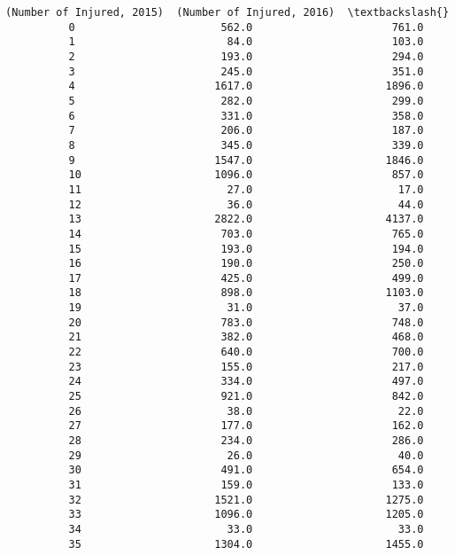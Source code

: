 \documentclass[11pt]{article}
\begin{document}
\begin{Verbatim}[commandchars=\\\{\}]
              (Number of Injured, 2015)  (Number of Injured, 2016)  \textbackslash{}
          0                       562.0                      761.0   
          1                        84.0                      103.0   
          2                       193.0                      294.0   
          3                       245.0                      351.0   
          4                      1617.0                     1896.0   
          5                       282.0                      299.0   
          6                       331.0                      358.0   
          7                       206.0                      187.0   
          8                       345.0                      339.0   
          9                      1547.0                     1846.0   
          10                     1096.0                      857.0   
          11                       27.0                       17.0   
          12                       36.0                       44.0   
          13                     2822.0                     4137.0   
          14                      703.0                      765.0   
          15                      193.0                      194.0   
          16                      190.0                      250.0   
          17                      425.0                      499.0   
          18                      898.0                     1103.0   
          19                       31.0                       37.0   
          20                      783.0                      748.0   
          21                      382.0                      468.0   
          22                      640.0                      700.0   
          23                      155.0                      217.0   
          24                      334.0                      497.0   
          25                      921.0                      842.0   
          26                       38.0                       22.0   
          27                      177.0                      162.0   
          28                      234.0                      286.0   
          29                       26.0                       40.0   
          30                      491.0                      654.0   
          31                      159.0                      133.0   
          32                     1521.0                     1275.0   
          33                     1096.0                     1205.0   
          34                       33.0                       33.0   
          35                     1304.0                     1455.0   

\end{Verbatim}
\end{document}

